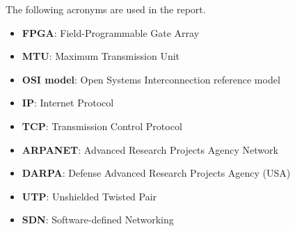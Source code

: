 The following acronyms are used in the report.
\begin{itemize}
  \item \textbf{FPGA}: Field-Programmable Gate Array
  \item \textbf{MTU}: Maximum Transmission Unit
  \item \textbf{OSI model}: Open Systems Interconnection reference model
  \item \textbf{IP}: Internet Protocol
  \item \textbf{TCP}: Transmission Control Protocol
  \item \textbf{ARPANET}: Advanced Research Projects Agency Network
  \item \textbf{DARPA}: Defense Advanced Research Projects Agency (USA)
  \item \textbf{UTP}: Unshielded Twisted Pair
  \item \textbf{SDN}: Software-defined Networking
\end{itemize}
